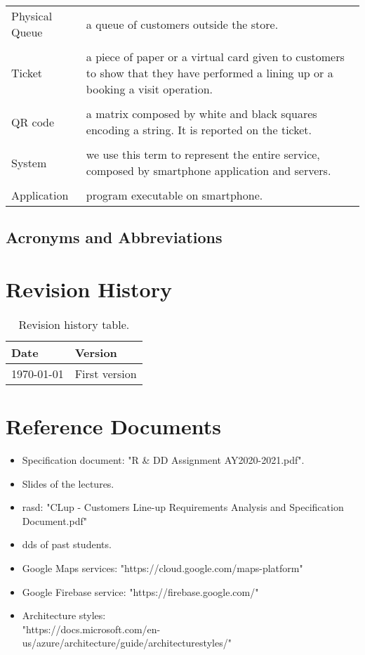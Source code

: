 \begin{tabularx}{\textwidth}{ >{\hsize=0.2\textwidth}X >{\hsize=0.8\textwidth}X}
    Physical Queue & a queue of customers outside the store.\\ \\
    Ticket & a piece of paper or a virtual card given to customers to show that they have performed a lining up or a booking a visit operation.\\ \\
    QR code & a matrix composed by white and black squares encoding a string. It is reported on the ticket.         \\ \\
    System & we use this term to represent the entire service, composed by smartphone application and servers.\\ \\
    Application & program executable on smartphone.
\end{tabularx}

\subsection{Acronyms and Abbreviations}

\printglossary

\section{Revision History}

\begin{table}[H]
    \centering
    \begin{tabular}{ m{} | m{} }
        \textbf{Date} & \textbf{Version} \\
        \hline
        \today        & First version          \\
    \end{tabular}
    \caption{Revision history table.}
    \label{table:revisionHistory}
\end{table}


\section{Reference Documents}

\begin{itemize}
    \item Specification document: "R \& DD Assignment AY2020-2021.pdf".
    \item Slides of the lectures.
    \item \gls{rasd}: "CLup - Customers Line-up Requirements Analysis and Specification Document.pdf"
	\item \glspl{dd} of past students.
    \item Google Maps services: "https://cloud.google.com/maps-platform"
    \item Google Firebase service: "https://firebase.google.com/"
    \item Architecture styles:\\ "https://docs.microsoft.com/en-us/azure/architecture/guide/architecturestyles/"
\end{itemize}



